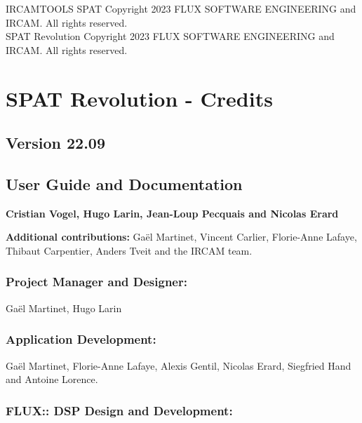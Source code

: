 \documentclass[
  letterpaper,
  DIV=11,
  numbers=noendperiod]{scrreport}
\begin{document}
IRCAMTOOLS SPAT Copyright 2023 FLUX SOFTWARE ENGINEERING and IRCAM. All
rights reserved.\\
SPAT Revolution Copyright 2023 FLUX SOFTWARE ENGINEERING and IRCAM. All
rights reserved.


\hypertarget{spat-revolution---credits}{%
\chapter{SPAT Revolution - Credits}\label{spat-revolution---credits}}

\hypertarget{version-22.09}{%
\section{Version 22.09}\label{version-22.09}}

\hypertarget{user-guide-and-documentation}{%
\section{User Guide and
Documentation}\label{user-guide-and-documentation}}

\textbf{Cristian Vogel, Hugo Larin, Jean-Loup Pecquais and Nicolas
Erard}

\textbf{Additional contributions:} Gaël Martinet, Vincent Carlier,
Florie-Anne Lafaye, Thibaut Carpentier, Anders Tveit and the IRCAM team.

\hypertarget{project-manager-and-designer}{%
\subsection{Project Manager and
Designer:}\label{project-manager-and-designer}}

Gaël Martinet, Hugo Larin

\hypertarget{application-development}{%
\subsection{Application Development:}\label{application-development}}

Gaël Martinet, Florie-Anne Lafaye, Alexis Gentil, Nicolas Erard,
Siegfried Hand and Antoine Lorence.

\hypertarget{flux-dsp-design-and-development}{%
\subsection{FLUX:: DSP Design and
Development:}\label{flux-dsp-design-and-development}}
\end{document}
